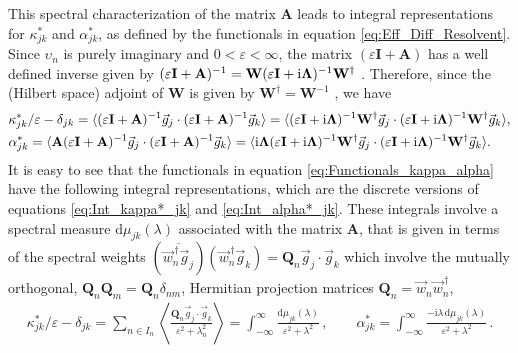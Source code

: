 \documentclass[11pt]{amsart}
\newcommand{\I}{\mathrm{i}}
\renewcommand{\d}{\mathrm{d}}
\newcommand{\Ib}{\mathbf{I}}
\newcommand{\Ab}{\mathbf{A}}
\newcommand{\Qb}{\mathbf{Q}}
\newcommand{\Wb}{\mathbf{W}}
\newcommand\bLambda{\mbox{\boldmath${\Lambda}$}}
\begin{document}
This spectral characterization of the matrix $\Ab$ leads to integral
representations for $\kappa_{jk}^*$ and $\alpha_{jk}^*$, as defined by the
functionals in equation \eqref{eq:Eff_Diff_Resolvent}. Since $\upsilon_n$ is
purely imaginary and $0<\varepsilon<\infty$, the matrix $(\varepsilon\Ib+\Ab)$ has a well defined
inverse given by
$(\varepsilon\Ib+\Ab)^{-1}=\Wb(\varepsilon\Ib+\I\bLambda)^{-1}\Wb^\dagger$
\cite{Horn_Johnson-1990}. Therefore, since the (Hilbert space) adjoint
of $\Wb$ is given by $\Wb^\dagger=\Wb^{-1}$
\cite{Horn_Johnson-1990,Keener-2000}, we have  
% 
\begin{align}\label{eq:Functionals_kappa_alpha}
  &\kappa^*_{jk}/\varepsilon-\delta_{jk}=\langle(\varepsilon\Ib+\Ab)^{-1}\vec{g}_j\cdot(\varepsilon\Ib+\Ab)^{-1}\vec{g}_k\rangle 
=\langle(\varepsilon\Ib+\I\bLambda)^{-1}\Wb^\dagger\vec{g}_j\cdot(\varepsilon\Ib+\I\bLambda)^{-1}\Wb^\dagger\vec{g}_k\rangle ,
\\
&\alpha^*_{jk}=\langle\Ab(\varepsilon\Ib+\Ab)^{-1}\vec{g}_j\cdot(\varepsilon\Ib+\Ab)^{-1}\vec{g}_k\rangle
=\langle\I\bLambda(\varepsilon\Ib+\I\bLambda)^{-1}\Wb^\dagger\vec{g}_j\cdot(\varepsilon\Ib+\I\bLambda)^{-1}\Wb^\dagger\vec{g}_k\rangle. 
\notag
\end{align}
%
It is easy to see that the functionals in equation
\eqref{eq:Functionals_kappa_alpha} have the following integral
representations, which are the discrete versions of equations
\eqref{eq:Int_kappa*_jk} and \eqref{eq:Int_alpha*_jk}. These integrals
involve a spectral measure $\d\mu_{jk}(\lambda)$ associated with the matrix
$\Ab$, that is given in terms of the spectral weights
$(\overline{\vec{w}_n^{\,\dagger}\vec{g}_j})(\vec{w}_n^{\,\dagger}\vec{g}_k)=\Qb_n\vec{g}_j\cdot\vec{g}_k$ 
which involve the mutually orthogonal, $\Qb_n\Qb_m=\Qb_n\delta_{nm}$,
Hermitian projection matrices $\Qb_n=\vec{w}_n\vec{w}_n^{\,\dagger}$,    
%
\begin{align}\label{eq:Integral_Rep_Discrete}
  \kappa^*_{jk}/\varepsilon-\delta_{jk}
 =\sum_{n\in I_n} 
 \left\langle\frac{\Qb_n\vec{g}_j\cdot\vec{g}_k}{\varepsilon^2+\lambda_n^2}\right\rangle
 =\int_{-\infty}^\infty\frac{\d\mu_{jk}(\lambda)}{\varepsilon^2+\lambda^2}\,,
 \qquad 
 \alpha^*_{jk}
 =\int_{-\infty}^\infty\frac{-\I\lambda\,\d\mu_{jk}(\lambda)}{\varepsilon^2+\lambda^2}\,.
\end{align}
\end{document}
